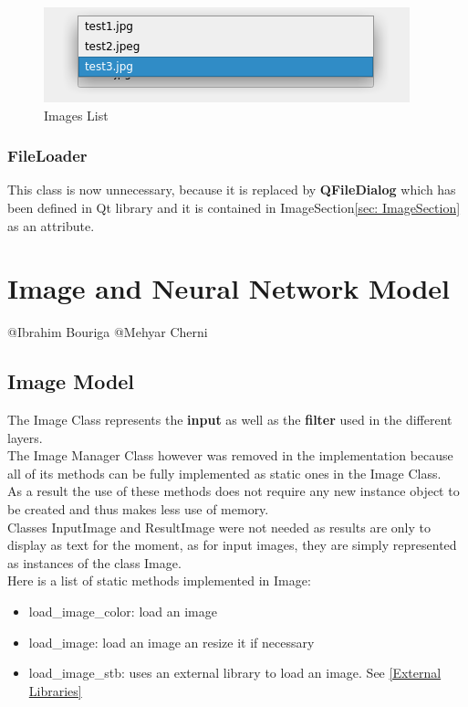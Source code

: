 \documentclass[parskip=full]{scrartcl}
\newcommand\tab[1][1cm]{\hspace*{#1}}
\begin{document}
	   \begin{figure}[H]
	        \centering
	        \includegraphics{images/imagesection2.PNG}
	        \caption{Images List}
	        \label{fig:my_label}
	    \end{figure}
	    
	    
        
        \subsubsection{FileLoader}
        \tab This class is now unnecessary, because it is replaced by \textbf{QFileDialog} which has been defined in Qt library and it is contained in ImageSection\ref{sec: ImageSection} as an attribute. 




\pagebreak

\section {Image and Neural Network Model} \label{Image and Neural Network Model}
	@Ibrahim Bouriga @Mehyar Cherni
	
	\subsection {Image Model}
	\tab The Image Class represents the \textbf{input} as well as the \textbf{filter} used in the different layers.\\
	The Image Manager Class however was removed in the implementation because all of its methods can be fully implemented as static ones in the Image Class.\\ As a result the use of these methods does not require any new instance object to be created and thus makes less use of memory. \\ Classes InputImage and ResultImage were not needed as results are only to display as text for the moment, as for input images, they are simply represented as instances of the class Image.\\ Here is a list of static methods implemented in Image:
	\begin {itemize}
		\item load\_image\_color: load an image
		\item load\_image: load an image an resize it if necessary
		\item load\_image\_stb: uses an external library to load an image. See \ref{External Libraries}
	\end{itemize}
\end{document}
